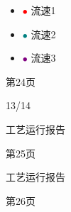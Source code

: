 \documentclass[UTF8,10pt,a4paper,fontset=fandol]{ctexart}
\newcommand{\fieldvalue}[1]{#1}
\newcommand{\handwritten}[1]{#1}
\begin{document}
\begin{center}
\begin{minipage}[t]{0.47\linewidth}
\begin{itemize}
\item[] \textcolor{red}{\(\bullet\)} 流速1
\item[] \textcolor{teal}{\(\bullet\)} 流速2
\item[] \textcolor{purple}{\(\bullet\)} 流速3
\end{itemize}

\vspace{0.3em}
第24页

\fieldvalue{\handwritten{13/14}}
\end{minipage}
\end{center}


\newpage

\begin{center}
\begin{minipage}[t]{0.46\linewidth}
\begin{center}
工艺运行报告
\end{center}

\begin{center}
\end{center}

\begin{center}
第25页
\end{center}
\end{minipage}
\hfill
\begin{minipage}[t]{0.46\linewidth}
\begin{center}
工艺运行报告
\end{center}

\begin{center}
\end{center}

\begin{center}
第26页
\end{center}
\end{minipage}
\end{center}
\end{document}
